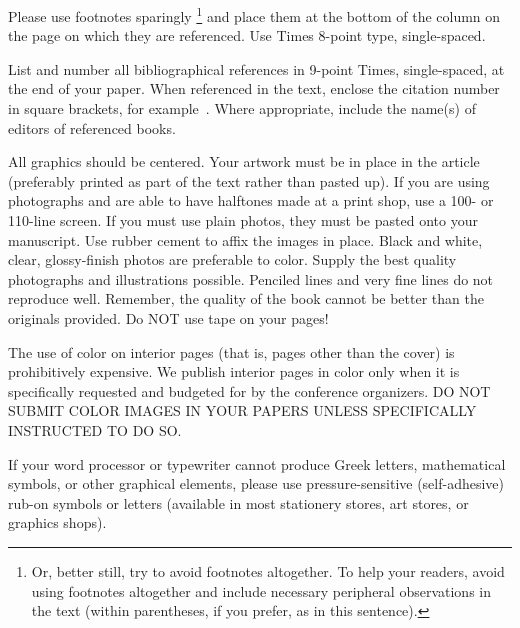\documentclass[times, 10pt,twocolumn]{article}
\begin{document}
Please use footnotes sparingly%
\footnote
   {%
     Or, better still, try to avoid footnotes altogether.  To help your 
     readers, avoid using footnotes altogether and include necessary 
     peripheral observations in the text (within parentheses, if you 
     prefer, as in this sentence).
   }
and place them at the bottom of the column on the page on which they are 
referenced. Use Times 8-point type, single-spaced.



List and number all bibliographical references in 9-point Times, 
single-spaced, at the end of your paper. When referenced in the text, 
enclose the citation number in square brackets, for example~\cite{ex1}. 
Where appropriate, include the name(s) of editors of referenced books.


All graphics should be centered. Your artwork must be in place in the 
article (preferably printed as part of the text rather than pasted up). 
If you are using photographs and are able to have halftones made at a 
print shop, use a 100- or 110-line screen. If you must use plain photos, 
they must be pasted onto your manuscript. Use rubber cement to affix the 
images in place. Black and white, clear, glossy-finish photos are 
preferable to color. Supply the best quality photographs and 
illustrations possible. Penciled lines and very fine lines do not 
reproduce well. Remember, the quality of the book cannot be better than 
the originals provided. Do NOT use tape on your pages!


The use of color on interior pages (that is, pages other
than the cover) is prohibitively expensive. We publish interior pages in 
color only when it is specifically requested and budgeted for by the 
conference organizers. DO NOT SUBMIT COLOR IMAGES IN YOUR 
PAPERS UNLESS SPECIFICALLY INSTRUCTED TO DO SO.


If your word processor or typewriter cannot produce Greek letters, 
mathematical symbols, or other graphical elements, please use 
pressure-sensitive (self-adhesive) rub-on symbols or letters (available 
in most stationery stores, art stores, or graphics shops).
\end{document}
